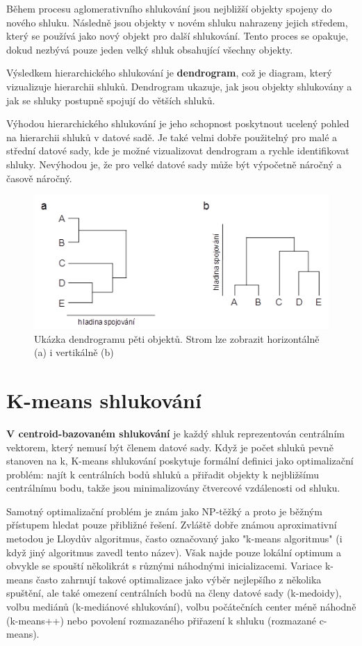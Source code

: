 \documentclass[czech,bachelor]{seminarka}
\begin{document}
Během procesu aglomerativního shlukování jsou nejbližší objekty spojeny do nového shluku. Následně jsou objekty v novém shluku nahrazeny jejich středem, který se používá jako nový objekt pro další shlukování. Tento proces se opakuje, dokud nezbývá pouze jeden velký shluk obsahující všechny objekty.

Výsledkem hierarchického shlukování je \textbf{dendrogram}, což je diagram, který vizualizuje hierarchii shluků. Dendrogram ukazuje, jak jsou objekty shlukovány a jak se shluky postupně spojují do větších shluků.

Výhodou hierarchického shlukování je jeho schopnost poskytnout ucelený pohled na hierarchii shluků v datové sadě. Je také velmi dobře použitelný pro malé a střední datové sady, kde je možné vizualizovat dendrogram a rychle identifikovat shluky. Nevýhodou je, že pro velké datové sady může být výpočetně náročný a časově náročný.
\begin{figure}[h]
	\centering
	\includegraphics[width=0.515\linewidth]{Figures/hierarchial.png}
	\caption{Ukázka dendrogramu pěti objektů. Strom lze zobrazit horizontálně (a) i vertikálně (b)\cite{mat_bio}}
\end{figure}
\section{K-means shlukování}

\textbf{V centroid-bazovaném shlukování} je každý shluk reprezentován centrálním vektorem, který nemusí být členem datové sady. Když je počet shluků pevně stanoven na k, K-means shlukování poskytuje formální definici jako optimalizační problém: najít k centrálních bodů shluků a přiřadit objekty k nejbližšímu centrálnímu bodu, takže jsou minimalizovány čtvercové vzdálenosti od shluku.

Samotný optimalizační problém je znám jako NP-těžký a proto je běžným přístupem hledat pouze přibližné řešení. Zvláště dobře známou aproximativní metodou je Lloydův algoritmus, často označovaný jako "k-means algoritmus" (i když jiný algoritmus zavedl tento název). Však najde pouze lokální optimum a obvykle se spouští několikrát s různými náhodnými inicializacemi. Variace k-means často zahrnují takové optimalizace jako výběr nejlepšího z několika spuštění, ale také omezení centrálních bodů na členy datové sady (k-medoidy), volbu mediánů (k-mediánové shlukování), volbu počátečních center méně náhodně (k-means++) nebo povolení rozmazaného přiřazení k shluku (rozmazané c-means).
\end{document}
